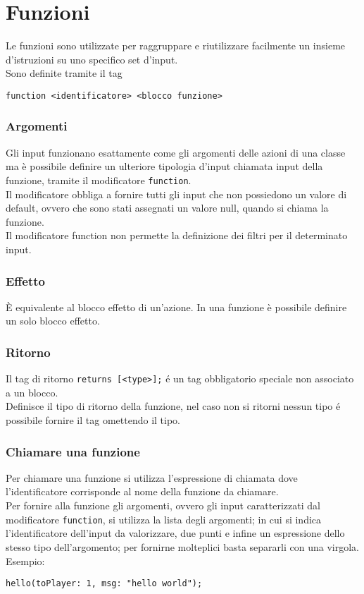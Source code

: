 \section{Funzioni}
Le funzioni sono utilizzate per raggruppare e riutilizzare facilmente un insieme d'istruzioni 
su uno specifico set d'input. \\ 
Sono definite tramite il tag 
\begin{lstlisting}
function <identificatore> <blocco funzione>
\end{lstlisting}

\subsubsection{Argomenti} \label{ModificatoreFunction}
Gli input funzionano esattamente come gli argomenti delle azioni di una classe ma è 
possibile definire un ulteriore tipologia d'input chiamata input della funzione,
tramite il modificatore \lstinline|function|. \\
Il modificatore obbliga a fornire tutti gli input che non possiedono un valore di default,
ovvero che sono stati assegnati un valore null, quando si chiama la funzione. \\
Il modificatore function non permette la definizione dei filtri per il determinato input.

\subsubsection{Effetto}
È equivalente al blocco effetto di un’azione. 
In una funzione è possibile definire un solo blocco effetto.

\subsubsection{Ritorno}
Il tag di ritorno \lstinline|returns [<type>];| é un tag obbligatorio speciale non associato a un blocco. \\
Definisce il tipo di ritorno della funzione, nel caso non si ritorni nessun tipo é possibile 
fornire il tag omettendo il tipo.

\subsubsection{Chiamare una funzione} \label{ChiamataFunzione}
Per chiamare una funzione si utilizza l'espressione di chiamata dove l'identificatore corrisponde al nome
della funzione da chiamare. \\
Per fornire alla funzione gli argomenti, ovvero gli input caratterizzati dal modificatore \lstinline|function|, si 
utilizza la lista degli argomenti; in cui si indica l'identificatore dell'input da valorizzare, due punti e 
infine un espressione dello stesso tipo dell'argomento; per fornirne molteplici basta separarli con una virgola. Esempio:
\begin{lstlisting}
hello(toPlayer: 1, msg: "hello world");
\end{lstlisting}

